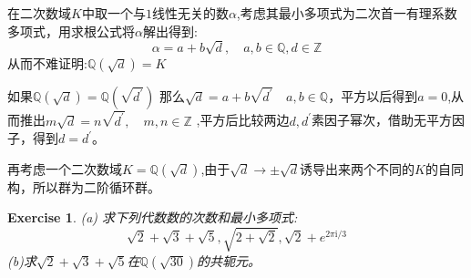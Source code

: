 \documentclass[12pt, a4paper]{ctexart}
\newenvironment{prooff}{{\noindent\it\textcolor{cyan!40!black}{Proof}:}\quad}{\par}
\newcommand{\bb}[1]{$\mathbb{#1}$}
\newcommand{\p}{^{\prime}}
\newtheorem{exer}{Exercise}[subsection]
\begin{document}
\begin{prooff}
    在二次数域$K$中取一个与$1$线性无关的数$\alpha$,考虑其最小多项式为二次首一有理系数多项式，用求根公式将$\alpha$解出得到:
    \begin{equation*}
        \alpha=a+b\sqrt{d},\quad a,b\in \mathbb{Q},d\in \mathbb{Z}
    \end{equation*}
    从而不难证明:\bb{Q}$(\sqrt{d})=K$


    如果$\mathbb{Q}(\sqrt{d})=\mathbb{Q}(\sqrt{d\p})$
    那么$\sqrt{d}=a+b\sqrt{d\p}\quad a,b\in \mathbb{Q}$，平方以后得到$a=0$,从而推出$m\sqrt{d}=n\sqrt{d\p},\quad m,n\in \mathbb{Z}$
    ,平方后比较两边$d,d\p$素因子幂次，借助无平方因子，得到$d=d\p$。

    再考虑一个二次数域$K=\mathbb{Q}(\sqrt{d})$,由于$\sqrt{d}\rightarrow \pm \sqrt{d}$诱导出来两个不同的$K$的自同构，所以群为二阶循环群。
\end{prooff}
\begin{exer}
    (a) 求下列代数数的次数和最小多项式:
    \begin{equation*}
        \sqrt{2}+\sqrt{3}+\sqrt{5},\sqrt{2+\sqrt{2}},\sqrt{2}+e^{2\pi\text{i}/3}
    \end{equation*}
    (b)求$\sqrt{2}+\sqrt{3}+\sqrt{5}$在$\mathbb{Q}(\sqrt{30})$的共轭元。
\end{exer}
\end{document}
